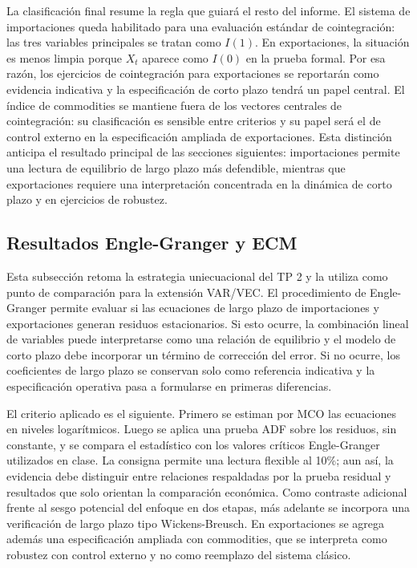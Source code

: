\documentclass[11pt,a4paper]{article}
\begin{document}
	La clasificación final resume la regla que guiará el resto del informe. El
	sistema de importaciones queda habilitado para una evaluación estándar de
	cointegración: las tres variables principales se tratan como \(I(1)\). En
	exportaciones, la situación es menos limpia porque \(X_t\) aparece como \(I(0)\)
	en la prueba formal. Por esa razón, los ejercicios de cointegración para
	exportaciones se reportarán como evidencia indicativa y la especificación de
	corto plazo tendrá un papel central. El índice de commodities se mantiene fuera
	de los vectores centrales de cointegración: su clasificación es sensible entre
	criterios y su papel será el de control externo en la especificación ampliada de
	exportaciones. Esta distinción anticipa el resultado principal de las secciones
	siguientes: importaciones permite una lectura de equilibrio de largo plazo más
	defendible, mientras que exportaciones requiere una interpretación concentrada
	en la dinámica de corto plazo y en ejercicios de robustez.

	\subsection{Resultados Engle-Granger y ECM}
	\label{subsec:resultados-eg-ecm}

	Esta subsección retoma la estrategia uniecuacional del TP 2 y la utiliza como
	punto de comparación para la extensión VAR/VEC. El procedimiento de
	Engle-Granger permite evaluar si las ecuaciones de largo plazo de importaciones
	y exportaciones generan residuos estacionarios. Si esto ocurre, la combinación
	lineal de variables puede interpretarse como una relación de equilibrio y el
	modelo de corto plazo debe incorporar un término de corrección del error. Si no
	ocurre, los coeficientes de largo plazo se conservan solo como referencia
	indicativa y la especificación operativa pasa a formularse en primeras
	diferencias.

	El criterio aplicado es el siguiente. Primero se estiman por MCO las ecuaciones
	en niveles logarítmicos. Luego se aplica una prueba ADF sobre los residuos, sin
	constante, y se compara el estadístico con los valores críticos
	Engle-Granger utilizados en clase. La consigna permite una lectura flexible al
	10\%; aun así, la evidencia debe distinguir entre relaciones respaldadas por la
	prueba residual y resultados que solo orientan la comparación económica. Como
	contraste adicional frente al sesgo potencial del enfoque en dos etapas, más
	adelante se incorpora una verificación de largo plazo tipo Wickens-Breusch. En
	exportaciones se agrega además una especificación ampliada con commodities, que
	se interpreta como robustez con control externo y no como reemplazo del sistema
	clásico.
\end{document}
